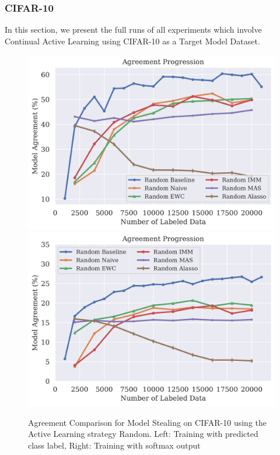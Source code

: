 \subsubsection{CIFAR-10}
\label{sec:Appendix:CALMS:CIFAR}
In this section, we present the full runs of all experiments which involve Continual Active Learning using CIFAR-10 as a Target Model Dataset.

\begin{figure}[!htb]
    \centering
    \includegraphics[width=0.48\linewidth]{images/results_CALMS/cifar_label_random.png} \hfill
    \includegraphics[width=0.48\linewidth]{images/results_CALMS/cifar100_softmax_random.png}
    \caption{Agreement Comparison for Model Stealing on CIFAR-10 using the Active Learning strategy Random. Left: Training with predicted class label,
    Right: Training with softmax output}
    \label{fig:CALMSCIFAR10Random}
\end{figure}


